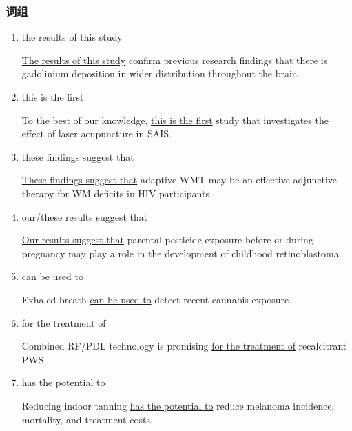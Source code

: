 \documentclass[a4paper]{ctexbook}
\begin{document}
    \subsubsection{词组}

    \begin{enumerate}
      \item the results of this study
      \begin{eg}{}
        \uline{The results of this study} confirm previous research findings that there is gadolinium deposition in wider distribution throughout the brain.
      \end{eg}

      \item this is the first
      \begin{eg}{}
        To the best of our knowledge, \uline{this is the first} study that investigates the effect of laser acupuncture in SAIS.  
      \end{eg}

      \item these findings suggest that
      \begin{eg}{}
        \uline{These findings suggest that} adaptive WMT may be an effective adjunctive therapy for WM deficits in HIV participants.  
      \end{eg}

      \item our/these results suggest that
      \begin{eg}{}
        \uline{Our results suggest that} parental pesticide exposure before or during pregnancy may play a role in the development of childhood retinoblastoma. 
      \end{eg}

      \item can be used to
      \begin{eg}{}
        Exhaled breath \uline{can be used to} detect recent cannabis exposure.
      \end{eg}

      \item for the treatment of
      \begin{eg}{}
        Combined RF/PDL technology is promising \uline{for the treatment of} recalcitrant PWS. 
      \end{eg}

      \item has the potential to
      \begin{eg}{}
        Reducing indoor tanning \uline{has the potential to} reduce melanoma incidence, mortality, and treatment costs. 
      \end{eg}

    \end{enumerate}
\end{document}
